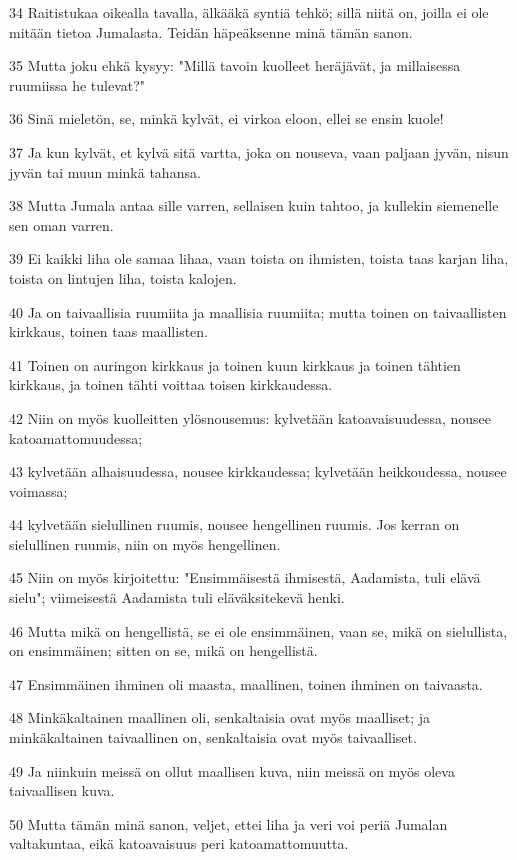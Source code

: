 \par 34 Raitistukaa oikealla tavalla, älkääkä syntiä tehkö; sillä niitä on, joilla ei ole mitään tietoa Jumalasta. Teidän häpeäksenne minä tämän sanon.
\par 35 Mutta joku ehkä kysyy: "Millä tavoin kuolleet heräjävät, ja millaisessa ruumiissa he tulevat?"
\par 36 Sinä mieletön, se, minkä kylvät, ei virkoa eloon, ellei se ensin kuole!
\par 37 Ja kun kylvät, et kylvä sitä vartta, joka on nouseva, vaan paljaan jyvän, nisun jyvän tai muun minkä tahansa.
\par 38 Mutta Jumala antaa sille varren, sellaisen kuin tahtoo, ja kullekin siemenelle sen oman varren.
\par 39 Ei kaikki liha ole samaa lihaa, vaan toista on ihmisten, toista taas karjan liha, toista on lintujen liha, toista kalojen.
\par 40 Ja on taivaallisia ruumiita ja maallisia ruumiita; mutta toinen on taivaallisten kirkkaus, toinen taas maallisten.
\par 41 Toinen on auringon kirkkaus ja toinen kuun kirkkaus ja toinen tähtien kirkkaus, ja toinen tähti voittaa toisen kirkkaudessa.
\par 42 Niin on myös kuolleitten ylösnousemus: kylvetään katoavaisuudessa, nousee katoamattomuudessa;
\par 43 kylvetään alhaisuudessa, nousee kirkkaudessa; kylvetään heikkoudessa, nousee voimassa;
\par 44 kylvetään sielullinen ruumis, nousee hengellinen ruumis. Jos kerran on sielullinen ruumis, niin on myös hengellinen.
\par 45 Niin on myös kirjoitettu: "Ensimmäisestä ihmisestä, Aadamista, tuli elävä sielu"; viimeisestä Aadamista tuli eläväksitekevä henki.
\par 46 Mutta mikä on hengellistä, se ei ole ensimmäinen, vaan se, mikä on sielullista, on ensimmäinen; sitten on se, mikä on hengellistä.
\par 47 Ensimmäinen ihminen oli maasta, maallinen, toinen ihminen on taivaasta.
\par 48 Minkäkaltainen maallinen oli, senkaltaisia ovat myös maalliset; ja minkäkaltainen taivaallinen on, senkaltaisia ovat myös taivaalliset.
\par 49 Ja niinkuin meissä on ollut maallisen kuva, niin meissä on myös oleva taivaallisen kuva.
\par 50 Mutta tämän minä sanon, veljet, ettei liha ja veri voi periä Jumalan valtakuntaa, eikä katoavaisuus peri katoamattomuutta.
